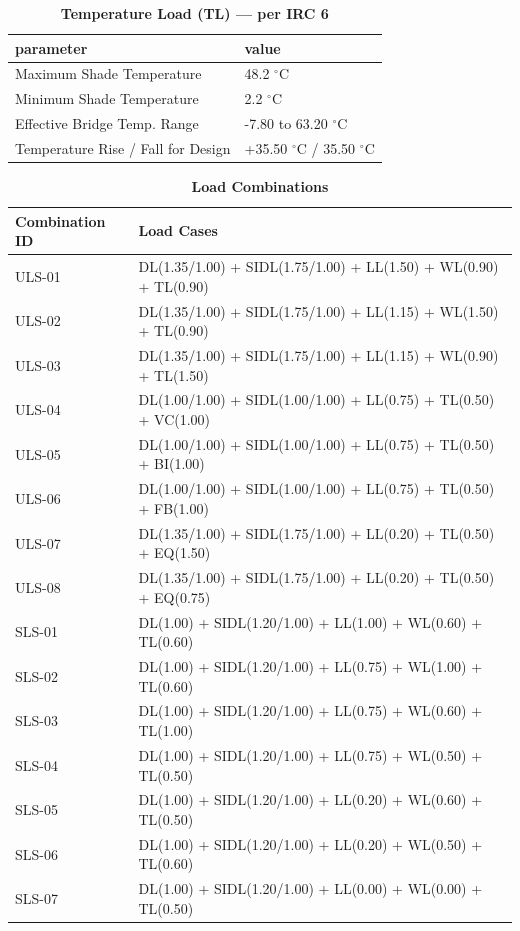 \documentclass[12pt,a4paper]{report}
\numberwithin{table}{chapter}
\numberwithin{figure}{chapter}
\begin{document}
\vspace{1em}
\begin{longtable}{|L{5.5cm}|p{10.0cm}|}
\caption{\textbf{Temperature Load (TL) --- per IRC 6}}
\hline
\textbf{parameter} & \textbf{value} \\
\hline
\textnormal{Maximum Shade Temperature} & 48.2 $^\circ$C \\[6pt]
\hline
\textnormal{Minimum Shade Temperature} & 2.2 $^\circ$C \\[6pt]
\hline
\textnormal{Effective Bridge Temp. Range} & -7.80 to 63.20 $^\circ$C \\[6pt]
\hline
\textnormal{Temperature Rise / Fall for Design} & +35.50 $^\circ$C / \textminus{}35.50 $^\circ$C \\[6pt]
\hline
\end{longtable}

\vspace{1em}
\begin{longtable}{|C{4.0cm}|p{11.5cm}|}
\caption{\textbf{Load Combinations}}
\hline
\textbf{Combination ID} & \textbf{Load Cases} \\[6pt]
\hline
ULS-01 & DL(1.35/1.00) + SIDL(1.75/1.00) + LL(1.50) + WL(0.90) + TL(0.90) \\[6pt]
\hline
ULS-02 & DL(1.35/1.00) + SIDL(1.75/1.00) + LL(1.15) + WL(1.50) + TL(0.90) \\[6pt]
\hline
ULS-03 & DL(1.35/1.00) + SIDL(1.75/1.00) + LL(1.15) + WL(0.90) + TL(1.50) \\[6pt]
\hline
ULS-04 & DL(1.00/1.00) + SIDL(1.00/1.00) + LL(0.75) + TL(0.50) + VC(1.00) \\[6pt]
\hline
ULS-05 & DL(1.00/1.00) + SIDL(1.00/1.00) + LL(0.75) + TL(0.50) + BI(1.00) \\[6pt]
\hline
ULS-06 & DL(1.00/1.00) + SIDL(1.00/1.00) + LL(0.75) + TL(0.50) + FB(1.00) \\[6pt]
\hline
ULS-07 & DL(1.35/1.00) + SIDL(1.75/1.00) + LL(0.20) + TL(0.50) + EQ(1.50) \\[6pt]
\hline
ULS-08 & DL(1.35/1.00) + SIDL(1.75/1.00) + LL(0.20) + TL(0.50) + EQ(0.75) \\[6pt]
\hline
SLS-01 & DL(1.00) + SIDL(1.20/1.00) + LL(1.00) + WL(0.60) + TL(0.60) \\[6pt]
\hline
SLS-02 & DL(1.00) + SIDL(1.20/1.00) + LL(0.75) + WL(1.00) + TL(0.60) \\[6pt]
\hline
SLS-03 & DL(1.00) + SIDL(1.20/1.00) + LL(0.75) + WL(0.60) + TL(1.00) \\[6pt]
\hline
SLS-04 & DL(1.00) + SIDL(1.20/1.00) + LL(0.75) + WL(0.50) + TL(0.50) \\[6pt]
\hline
SLS-05 & DL(1.00) + SIDL(1.20/1.00) + LL(0.20) + WL(0.60) + TL(0.50) \\[6pt]
\hline
SLS-06 & DL(1.00) + SIDL(1.20/1.00) + LL(0.20) + WL(0.50) + TL(0.60) \\[6pt]
\hline
SLS-07 & DL(1.00) + SIDL(1.20/1.00) + LL(0.00) + WL(0.00) + TL(0.50) \\[6pt]
\hline
\end{longtable}
\end{document}
